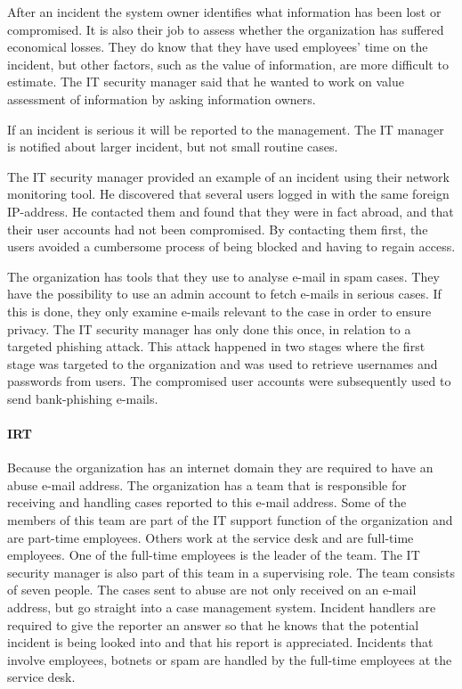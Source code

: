 After an incident the system owner identifies what information has been lost or compromised. It is also their job to assess whether the organization has suffered economical losses. They do know that they have used employees' time on the incident, but other factors, such as the value of information, are more difficult to estimate. The IT security manager said that he wanted to work on value assessment of information by asking information owners.

If an incident is serious it will be reported to the management. The IT manager is notified about larger incident, but not small routine cases.

The IT security manager provided an example of an incident using their network monitoring tool. He discovered that several users logged in with the same foreign IP-address. He contacted them and found that they were in fact abroad, and that their user accounts had not been compromised. By contacting them first, the users avoided a cumbersome process of being blocked and having to regain access. 

The organization has tools that they use to analyse e-mail in spam cases. They have the possibility to use an admin account to fetch e-mails in serious cases. If this is done, they only examine e-mails relevant to the case in order to ensure privacy. The IT security manager has only done this once, in relation to a targeted phishing attack. This attack happened in two stages where the first stage was targeted to the organization and was used to retrieve usernames and passwords from users. The compromised user accounts were subsequently used to send bank-phishing e-mails.

\paragraph{\acl{IRT}}
Because the organization has an internet domain they are required to have an abuse e-mail address. The organization has a team that is responsible for receiving and handling cases reported to this e-mail address. Some of the members of this team are part of the IT support function of the organization and are part-time employees. Others work at the service desk and are full-time employees. One of the full-time employees is the leader of the team. The IT security manager is also part of this team in a supervising role. The team consists of seven people. The cases sent to abuse are not only received on an e-mail address, but go straight into a case management system. Incident handlers are required to give the reporter an answer so that he knows that the potential incident is being looked into and that his report is appreciated. Incidents that involve employees, botnets or spam are handled by the full-time employees at the service desk.

